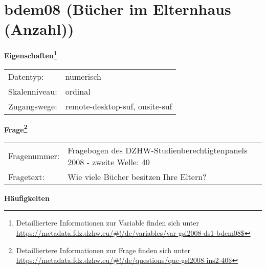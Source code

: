 
    \setcounter{footnote}{0}

    \vspace*{-1.8cm}
	\section{bdem08 (Bücher im Elternhaus (Anzahl))}
	\label{section:bdem08}



    \vspace*{0.5cm}
    \noindent\textbf{Eigenschaften\footnote{Detailliertere Informationen zur Variable finden sich unter
		\url{https://metadata.fdz.dzhw.eu/\#!/de/variables/var-gsl2008-ds1-bdem08$}}}\\
	\begin{tabularx}{\hsize}{@{}lX}
	Datentyp: & numerisch \\
	Skalenniveau: & ordinal \\
	Zugangswege: &
	  remote-desktop-suf, 
	  onsite-suf
 \\
    \end{tabularx}



				\vspace*{0.5cm}
                \noindent\textbf{Frage\footnote{Detailliertere Informationen zur Frage finden sich unter
		              \url{https://metadata.fdz.dzhw.eu/\#!/de/questions/que-gsl2008-ins2-40$}}}\\
				\begin{tabularx}{\hsize}{@{}lX}
					Fragenummer: &
					  Fragebogen des DZHW-Studienberechtigtenpanels 2008 - zweite Welle:
					  40
 \\
					Fragetext: & Wie viele Bücher besitzen Ihre Eltern? \\
				\end{tabularx}





        		\vspace*{0.5cm}
                \noindent\textbf{Häufigkeiten}


